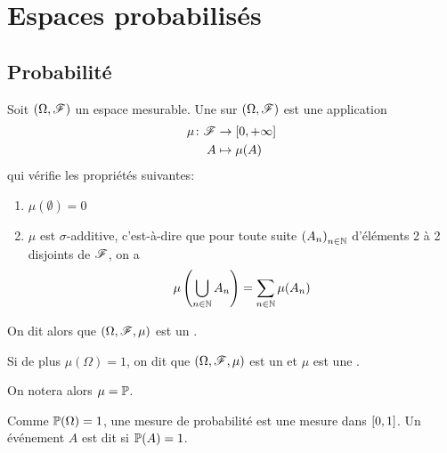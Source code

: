 \section{Espaces probabilisés}\label{subsec:1}


\subsection{Probabilité}\label{subsubsec:1-1}
\setcounter{subsection}{0}
\begin{definition}
    Soit \((\Omega, \mathscr{F})\) un espace mesurable. Une
     sur \((\Omega, \mathscr{F})\) est une application
    \begin{equation*}
        \begin{aligned}
            \mu\colon \mathscr{F} &\to \mathopen{}\left[0,+\infty\right]\mathclose{}\\
            A &\mapsto \mu(A)
        \end{aligned}
    \end{equation*}
    qui vérifie les propriétés suivantes:
    \begin{enumerate}
        \item \(\mu(\emptyset) = 0\)
        \item \(\mu\) est \(\sigma\)-additive, c'est-à-dire que pour
        toute suite \({(A_n)}_{n\in\mathbb{N}}\) d'éléments 2 à 2
        disjoints de \(\mathscr{F}\), on a
        \begin{equation*}
            \mu\left(\bigcup_{n\in\mathbb{N}}A_n\right) = \sum_{n\in\mathbb{N}}\mu(A_n)
        \end{equation*}
    \end{enumerate}

    On dit alors que \((\Omega, \mathscr{F},\mu)\) est un .

    Si de plus \(\mu(\Omega) = 1\), on dit que \((\Omega, \mathscr{F},\mu)\)
    est un  et \(\mu\) est une .

    On notera alors \(\mu = \mathbb{P}\).
\end{definition}

\begin{remark}
    Comme \(\mathbb{P}(\Omega)=1\), une mesure de probabilité est une mesure
    dans \(\mathopen{}\left[0,1\right]\mathclose{}\). Un événement \(A\) est dit 
    si \(\mathbb{P}(A) = 1\).
\end{remark}

